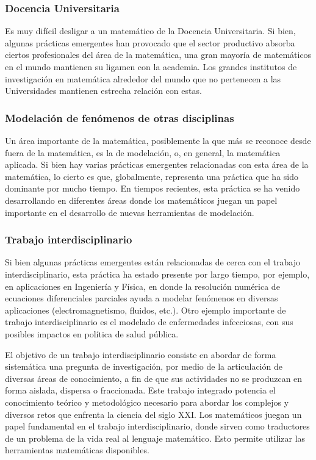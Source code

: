 \subsubsection*{Docencia Universitaria }


Es muy difícil desligar a un matemático de la Docencia Universitaria. Si bien, algunas prácticas emergentes han provocado que el sector productivo absorba ciertos profesionales del área de la matemática, una gran mayoría de matemáticos en el mundo mantienen su ligamen con la academia. Los grandes institutos de investigación en matemática alrededor del mundo que no pertenecen a las Universidades mantienen estrecha relación con estas.

\subsubsection*{Modelación de fenómenos de otras disciplinas}

Un área importante de la matemática, posiblemente la que más se reconoce desde fuera de la matemática, es la de modelación, o, en general, la matemática aplicada. Si bien hay varias prácticas emergentes relacionadas con esta área de la matemática, lo cierto es que, globalmente, representa una práctica que ha sido dominante por mucho tiempo. En tiempos recientes, esta práctica se ha venido desarrollando en diferentes áreas donde los matemáticos juegan un papel importante en el desarrollo de nuevas herramientas de modelación. 

\subsubsection*{Trabajo interdisciplinario}


Si bien algunas prácticas emergentes están relacionadas de cerca con el trabajo interdisciplinario, esta práctica ha estado presente por largo tiempo, por ejemplo, en aplicaciones en Ingeniería y Física, en donde la resolución numérica de ecuaciones diferenciales parciales ayuda a modelar fenómenos en diversas aplicaciones (electromagnetismo, fluidos, etc.). Otro ejemplo importante de trabajo interdisciplinario es el modelado de enfermedades infecciosas, con sus posibles impactos en política de salud pública. 

El objetivo de un trabajo interdisciplinario consiste en abordar de forma sistemática una pregunta de investigación, por medio de la articulación de diversas áreas de conocimiento, a fin de que sus actividades no se produzcan en forma aislada, dispersa o fraccionada. Este trabajo integrado potencia el conocimiento teórico y metodológico necesario para abordar los complejos y diversos retos que enfrenta la ciencia del siglo XXI. Los matemáticos juegan un papel fundamental en el trabajo interdisciplinario, donde sirven como traductores de un problema de la vida real al lenguaje matemático. Esto permite utilizar las herramientas matemáticas disponibles. 

